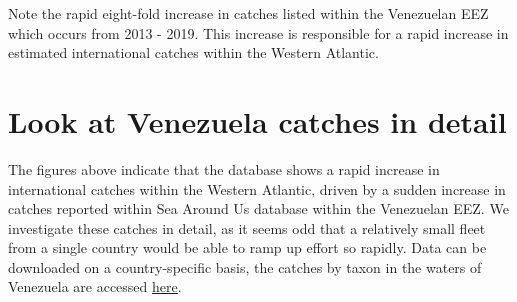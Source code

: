 \documentclass[
  letterpaper,
  oneside,
  open=any]{scrbook}
\begin{document}
Note the rapid eight-fold increase in catches listed within the
Venezuelan EEZ which occurs from 2013 - 2019. This increase is
responsible for a rapid increase in estimated international catches
within the Western Atlantic.

\section{Look at Venezuela catches in
detail}\label{look-at-venezuela-catches-in-detail}

The figures above indicate that the database shows a rapid increase in
international catches within the Western Atlantic, driven by a sudden
increase in catches reported within Sea Around Us database within the
Venezuelan EEZ. We investigate these catches in detail, as it seems odd
that a relatively small fleet from a single country would be able to
ramp up effort so rapidly. Data can be downloaded on a country-specific
basis, the catches by taxon in the waters of Venezuela are accessed
\href{https://www.seaaroundus.org/data/\#/eez/862?chart=catch-chart&dimension=taxon&measure=tonnage&limit=10}{here}.
\end{document}
